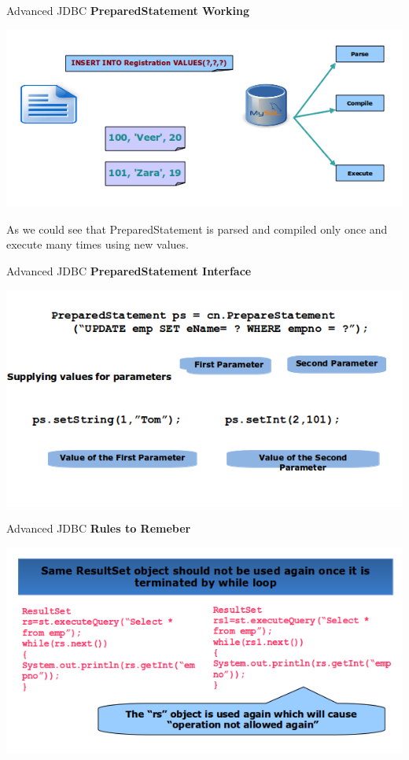 \documentclass[14pt]{beamer}
\begin{document}
\begin{frame}{Advanced JDBC}
\textbf{PreparedStatement Working}
\begin{center}
    \includegraphics[scale=0.5]{JEE-M03-S02-Image3.png}
  \end{center}
As we could see that PreparedStatement is parsed and compiled only once and execute many times using new values.
\end{frame}

\begin{frame}{Advanced JDBC}
\textbf{PreparedStatement Interface}
\begin{center}
    \includegraphics[scale=0.5]{JEE-M03-S02-Image4.png}
  \end{center}

\end{frame}

\begin{frame}{Advanced JDBC}
\textbf{Rules to Remeber}
\begin{center}
    \includegraphics[scale=0.5]{JEE-M03-S02-Image5.png}
  \end{center}

\end{frame}
\end{document}
